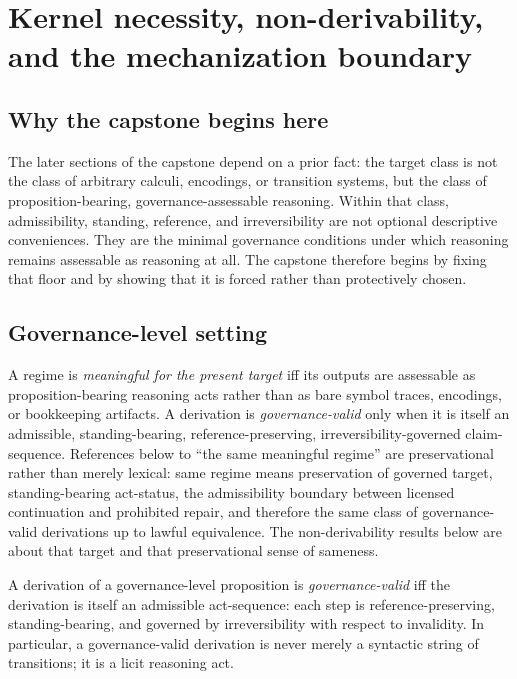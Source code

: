\section{Kernel necessity, non-derivability, and the mechanization boundary}
\label{sec:kernel-floor}

\subsection{Why the capstone begins here}

The later sections of the capstone depend on a prior fact: the target class is not the class of arbitrary calculi, encodings, or transition systems, but the class of proposition-bearing, governance-assessable reasoning. Within that class, admissibility, standing, reference, and irreversibility are not optional descriptive conveniences. They are the minimal governance conditions under which reasoning remains assessable as reasoning at all. The capstone therefore begins by fixing that floor and by showing that it is forced rather than protectively chosen.

\subsection{Governance-level setting}

A regime is \emph{meaningful for the present target} iff its outputs are assessable as proposition-bearing reasoning acts rather than as bare symbol traces, encodings, or bookkeeping artifacts. A derivation is \emph{governance-valid} only when it is itself an admissible, standing-bearing, reference-preserving, irreversibility-governed claim-sequence. References below to ``the same meaningful regime'' are preservational rather than merely lexical: same regime means preservation of governed target, standing-bearing act-status, the admissibility boundary between licensed continuation and prohibited repair, and therefore the same class of governance-valid derivations up to lawful equivalence. The non-derivability results below are about that target and that preservational sense of sameness.\cite{MaleyFoundationalClosure,MaleyNecessity}

\begin{definition}
A derivation of a governance-level proposition is \emph{governance-valid} iff the derivation is itself an admissible act-sequence: each step is reference-preserving, standing-bearing, and governed by irreversibility with respect to invalidity. In particular, a governance-valid derivation is never merely a syntactic string of transitions; it is a licit reasoning act.
\end{definition}

